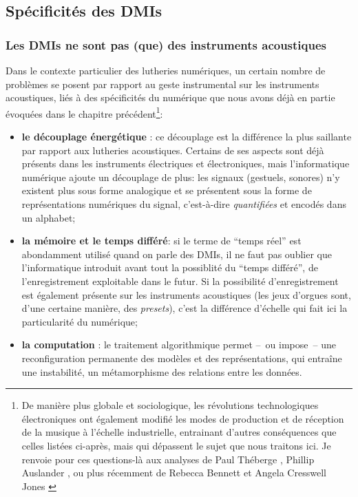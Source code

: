 \subsection{Spécificités des DMIs}

\subsubsection{Les DMIs ne sont pas (que) des instruments acoustiques}

\noindent Dans le contexte particulier des lutheries numériques, un certain nombre de problèmes se posent par rapport au geste instrumental sur les instruments acoustiques, liés à des spécificités du numérique que nous avons déjà en partie évoquées dans le chapitre précédent\footnote{De manière plus globale et sociologique, les révolutions technologiques électroniques ont également modifié les modes de production et de réception de la musique à l'échelle industrielle, entrainant d'autres conséquences que celles listées ci-après, mais qui dépassent le sujet que nous traitons ici. Je renvoie pour ces questions-là aux analyses de Paul Théberge \cite{theberge_any_1997}, Phillip Auslander \cite{auslander_liveness:_2008}, ou plus récemment de Rebecca Bennett et Angela Cresswell Jones \cite{jones_digital_2015}}:
\vspace{-1em}
\begin{itemize}[noitemsep]
	\item \textbf{le découplage énergétique} : ce découplage est la différence la plus saillante par rapport aux lutheries acoustiques. Certains de ses aspects sont déjà présents dans les instruments électriques et électroniques, mais l'informatique numérique ajoute un découplage de plus: les signaux (gestuels, sonores) n'y existent plus sous forme analogique et se présentent sous la forme de représentations numériques du signal, c'est-à-dire \textit{quantifiées} et encodés dans un alphabet;
	\item \textbf{la mémoire et le temps différé}: si le terme de ``temps réel'' est abondamment utilisé quand on parle des \glspl{DMI}, il ne faut pas oublier que l'informatique introduit avant tout la possiblité du ``temps différé'', de l'enregistrement exploitable dans le futur. Si la possibilité d'enregistrement est également présente sur les instruments acoustiques (les jeux d'orgues sont, d'une certaine manière, des \textit{presets}), c'est la différence d'échelle qui fait ici la particularité du numérique;
	\item \textbf{la computation} : le traitement algorithmique permet --~ou impose~-- une reconfiguration permanente des modèles et des représentations, qui entraîne une instabilité, un métamorphisme des relations entre les données.
\end{itemize}

